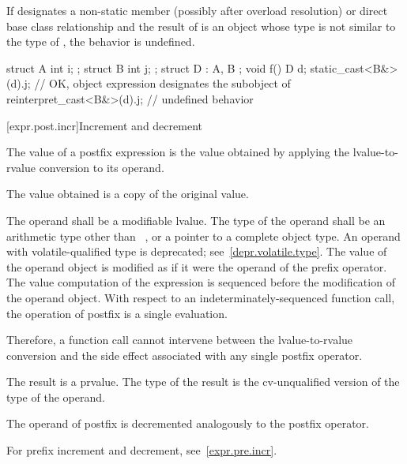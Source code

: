 \pnum
If  designates a non-static member
(possibly after overload resolution)
or direct base class relationship and
the result of  is an object whose type
is not similar to the type of ,
the behavior is undefined.
\begin{example}
\begin{codeblock}
struct A { int i; };
struct B { int j; };
struct D : A, B {};
void f() {
  D d;
  static_cast<B&>(d).j;             // OK, object expression designates the  subobject of 
  reinterpret_cast<B&>(d).j;        // undefined behavior
}
\end{codeblock}
\end{example}

[expr.post.incr]{Increment and decrement}

\pnum
{}%
%
%
%
The value of a postfix \tcode{++} expression is the value obtained by
applying the lvalue-to-rvalue conversion to its operand.
\begin{note}
The value obtained is a copy of the original value.
\end{note}
The operand shall be a modifiable lvalue. The type of the operand shall
be an arithmetic type other than \cv{}~,
or a pointer to a complete object type.
An operand with volatile-qualified type is deprecated;
see~\ref{depr.volatile.type}.
The value of the operand object is modified
as if it were the operand of the prefix \tcode{++} operator.
The
%
value computation of the \tcode{++} expression is sequenced before the
modification of the operand object. With respect to an
indeterminately-sequenced function call, the operation of postfix
\tcode{++} is
a single evaluation.
\begin{note}
Therefore, a function call cannot intervene between the
lvalue-to-rvalue conversion and the side effect associated with any
single postfix \tcode{++} operator.
\end{note}
The result is a prvalue. The type of the result is the cv-unqualified
version of the type of the operand.

\pnum
{}%
%
%
%
The operand of postfix \tcode{--} is decremented analogously to the
postfix \tcode{++} operator.
\begin{note}
For prefix increment and decrement, see~\ref{expr.pre.incr}.
\end{note}

